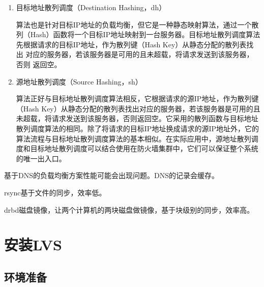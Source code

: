 \begin{enumerate}[itemsep=0pt,parsep=0pt]
\item 目标地址散列调度（Destination Hashing，dh）

  算法也是针对目标IP地址的负载均衡，但它是一种静态映射算法，通过一个散
  列（Hash）函数将一个目标IP地址映射到一台服务器。目标地址散列调度算法
  先根据请求的目标IP地址，作为散列键（Hash Key）从静态分配的散列表找出
  对应的服务器，若该服务器是可用的且未超载，将请求发送到该服务器，否则
  返回空。

\item 源地址散列调度（Source Hashing，sh）

  算法正好与目标地址散列调度算法相反，它根据请求的源IP地址，作为散列键
  （Hash Key）从静态分配的散列表找出对应的服务器，若该服务器是可用的且
  未超载，将请求发送到该服务器，否则返回空。它采用的散列函数与目标地址
  散列调度算法的相同。除了将请求的目标IP地址换成请求的源IP地址外，它的
  算法流程与目标地址散列调度算法的基本相似。在实际应用中，源地址散列调
  度和目标地址散列调度可以结合使用在防火墙集群中，它们可以保证整个系统
  的唯一出入口。
\end{enumerate}


基于DNS的负载均衡方案性能可能会出现问题。DNS的记录会缓存。

rsync基于文件的同步，效率低。

drbd磁盘镜像，让两个计算机的两块磁盘做镜像，基于块级别的同步，效率高。

\section{安装LVS}
\label{installLVS}

\subsection{环境准备}
\label{sec:lvsEnvPrepare}

